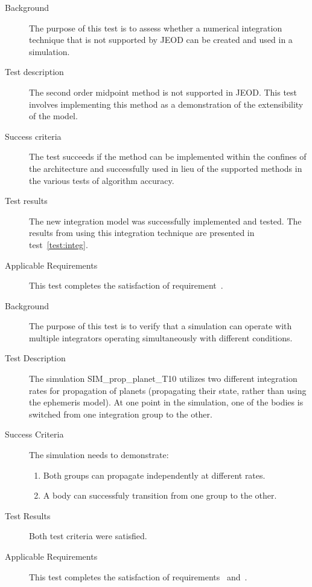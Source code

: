 \label{test:extensibility}
\begin{description}
\item[Background]
The purpose of this test is to assess whether a numerical integration
technique that is not supported by JEOD can be created and used in
a simulation.
\item[Test description] The second order midpoint method is not supported
in JEOD. This test involves implementing this method as a demonstration
of the extensibility of the model.
\item[Success criteria]
The test succeeds if the method can be implemented within the confines
of the \ModelDesc architecture and successfully used in lieu of the
supported methods in the various tests of algorithm accuracy.
\item[Test results]
The new integration model was successfully implemented and tested.
The results from using this integration technique are presented
in test~\ref{test:integ}.
\item[Applicable Requirements]
This test completes the satisfaction of 
requirement~.

\end{description}


\label{test:multiple_groups}
\begin{description}
 \item[Background]
 The purpose of this test is to verify that a simulation can operate with  
 multiple integrators operating simultaneously with different conditions. 
 \item [Test Description] The simulation SIM\_prop\_planet\_T10 utilizes two 
 different integration rates for propagation of planets (propagating their 
 state, rather than using the ephemeris model).  At one point in the 
 simulation, one of the bodies is switched from one integration group to the 
 other.
 \item [Success Criteria]
 The simulation needs to demonstrate:
 \begin{enumerate}
  \item Both groups can propagate independently at different rates.
  \item A body can successfuly transition from one group to the other.
 \end{enumerate}
 \item [Test Results]  Both test criteria were satisfied.
 \item[Applicable Requirements]
This test completes the satisfaction of 
requirements~
and~.

\end{description}



